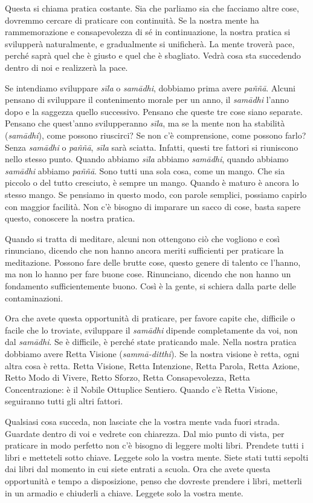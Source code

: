 Questa si chiama pratica costante. Sia che parliamo sia che facciamo
altre cose, dovremmo cercare di praticare con continuità. Se la nostra
mente ha rammemorazione e consapevolezza di sé in continuazione, la
nostra pratica si svilupperà naturalmente, e gradualmente si unificherà.
La mente troverà pace, perché saprà quel che è giusto e quel che è
sbagliato. Vedrà cosa sta succedendo dentro di noi e realizzerà la pace.

Se intendiamo sviluppare \emph{sīla} o \emph{samādhi}, dobbiamo prima
avere \emph{paññā}. Alcuni pensano di sviluppare il contenimento morale
per un anno, il \emph{samādhi} l'anno dopo e la saggezza quello
successivo. Pensano che queste tre cose siano separate. Pensano che
quest'anno svilupperanno \emph{sīla}, ma se la mente non ha stabilità
(\emph{samādhi}), come possono riuscirci? Se non c'è comprensione, come
possono farlo? Senza \emph{samādhi} o \emph{paññā}, \emph{sīla} sarà
sciatta. Infatti, questi tre fattori si riuniscono nello stesso punto.
Quando abbiamo \emph{sīla} abbiamo \emph{samādhi}, quando abbiamo
\emph{samādhi} abbiamo \emph{paññā}. Sono tutti una sola cosa, come un
mango. Che sia piccolo o del tutto cresciuto, è sempre un mango. Quando
è maturo è ancora lo stesso mango. Se pensiamo in questo modo, con
parole semplici, possiamo capirlo con maggior facilità. Non c'è bisogno
di imparare un sacco di cose, basta sapere questo, conoscere la nostra
pratica.

Quando si tratta di meditare, alcuni non ottengono ciò che vogliono e
così rinunciano, dicendo che non hanno ancora meriti sufficienti per
praticare la meditazione. Possono fare delle brutte cose, questo genere
di talento ce l'hanno, ma non lo hanno per fare buone cose. Rinunciano,
dicendo che non hanno un fondamento sufficientemente buono. Così è la
gente, si schiera dalla parte delle contaminazioni.

Ora che avete questa opportunità di praticare, per favore capite che,
difficile o facile che lo troviate, sviluppare il \emph{samādhi} dipende
completamente da voi, non dal \emph{samādhi}. Se è difficile, è perché
state praticando male. Nella nostra pratica dobbiamo avere Retta Visione
(\emph{sammā-ditthi}). Se la nostra visione è retta, ogni altra cosa è
retta. Retta Visione, Retta Intenzione, Retta Parola, Retta Azione,
Retto Modo di Vivere, Retto Sforzo, Retta Consapevolezza, Retta
Concentrazione: è il Nobile Ottuplice Sentiero. Quando c'è Retta
Visione, seguiranno tutti gli altri fattori.

Qualsiasi cosa succeda, non lasciate che la vostra mente vada fuori
strada. Guardate dentro di voi e vedrete con chiarezza. Dal mio punto di
vista, per praticare in modo perfetto non c'è bisogno di leggere molti
libri. Prendete tutti i libri e metteteli sotto chiave. Leggete solo la
vostra mente. Siete stati tutti sepolti dai libri dal momento in cui
siete entrati a scuola. Ora che avete questa opportunità e tempo a
disposizione, penso che dovreste prendere i libri, metterli in un
armadio e chiuderli a chiave. Leggete solo la vostra mente.

